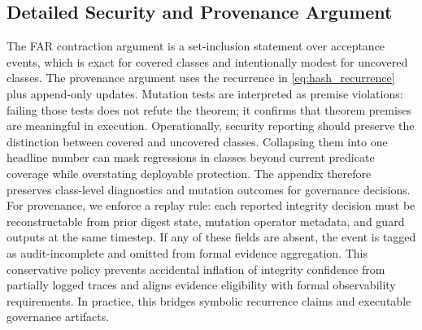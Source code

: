 \documentclass{article} %
\begin{document}
\subsection{Detailed Security and Provenance Argument}
The FAR contraction argument is a set-inclusion statement over acceptance events, which is exact for covered classes and intentionally modest for uncovered classes. The provenance argument uses the recurrence in \eqref{eq:hash_recurrence} plus append-only updates. Mutation tests are interpreted as premise violations: failing those tests does not refute the theorem; it confirms that theorem premises are meaningful in execution.
Operationally, security reporting should preserve the distinction between covered and uncovered classes. Collapsing them into one headline number can mask regressions in classes beyond current predicate coverage while overstating deployable protection. The appendix therefore preserves class-level diagnostics and mutation outcomes for governance decisions.
For provenance, we enforce a replay rule: each reported integrity decision must be reconstructable from prior digest state, mutation operator metadata, and guard outputs at the same timestep. If any of these fields are absent, the event is tagged as audit-incomplete and omitted from formal evidence aggregation. This conservative policy prevents accidental inflation of integrity confidence from partially logged traces and aligns evidence eligibility with formal observability requirements. In practice, this bridges symbolic recurrence claims and executable governance artifacts.
\end{document}
